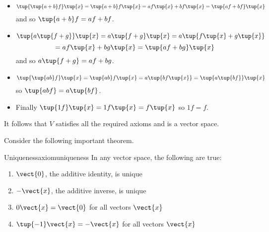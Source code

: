 \begin{solution}
\begin{itemize}
\item
\begin{equation*}
\tup{\tup{a+b} f} \tup{x} = \tup{a+b}
f\tup{x} =af\tup{x} +bf\tup{x} = \tup{
af+bf} \tup{x}
\end{equation*}
and so $\tup{a+b} f=af+bf$. 

\item
\begin{equation*}
\tup{a\tup{f+g} } \tup{x} = a\tup{f+g}
\tup{x} = a\tup{f\tup{x} +g\tup{x} }
\end{equation*}
\begin{equation*}
=af\tup{x} +bg\tup{x} = \tup{af+bg} \tup{
x}
\end{equation*}
and so $a\tup{f+g} =af+bg$. 

\item
\begin{equation*}
\tup{\tup{ab} f} \tup{x} = \tup{ab}
f\tup{x} =a\tup{bf\tup{x} } = \tup{a\tup{
bf} } \tup{x}
\end{equation*}
so $\tup{abf} =a\tup{bf} $. 

\item
Finally $\tup{1f} \tup{
x} = 1f\tup{x} =f\tup{x} $ so $1f=f$.
\end{itemize}

It follows that $V$ satisfies all the required axioms and is a vector space.
\end{solution}

Consider the following important theorem.

\begin{theorem}{Uniqueness}{axiomuniqueness}
In any vector space, the following are true:
\begin{enumerate}
\item
$\vect{0}$, the additive identity, is unique
\item
$-\vect{x}$, the additive inverse, is unique
\item
$0\vect{x}=\vect{0}$ for all vectors $\vect{x}$
\item
$\tup{-1} \vect{x}=-\vect{x}$ for all vectors $\vect{x}$ 
\end{enumerate}
\end{theorem}

